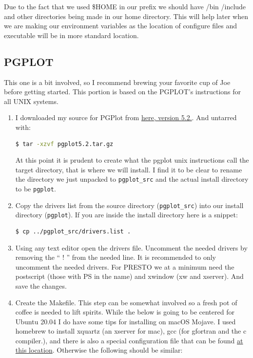 \documentclass{article}
\begin{document}
    	Due to the fact that we used \$HOME in our prefix we should have /bin /include and other directories
    	being made in our home directory. This will help later when we are making our environment variables
    	as the location of configure files and executable will be in more standard location.
    
    	\subsection{PGPLOT}
    	This one is a bit involved, so I recommend brewing your favorite cup of Joe before getting started. This
    	portion is based on the PGPLOT’s instructions for all UNIX systems. 
    	\begin{enumerate}
    	\item \noindent I downloaded my source for PGPlot from \href{ftp://ftp.astro.caltech.edu/pub/pgplot/pgplot5.2.tar.gz}{here, version 5.2.}. And untarred with: 
    	\begin{lstlisting}[language=bash]
    	$ tar -xzvf pgplot5.2.tar.gz
    	\end{lstlisting}
    	 At this point it is prudent to create what the pgplot unix instructions call the target directory, that is where we will install. I find it to be clear to rename the directory we just unpacked to \texttt{pgplot\_src} and the actual install directory to be \texttt{pgplot}. 
    	\item Copy the drivers list from the source directory (\texttt{pgplot\_src}) into our install directory (\texttt{pgplot}). If you are inside the install directory here is a snippet: \noindent
    	\begin{lstlisting}[language=bash]
    	$ cp ../pgplot_src/drivers.list .
    	\end{lstlisting} 
    	\item Using any text editor open the drivers file. Uncomment the needed drivers by removing the `` ! '' from the needed line. It is recommended to only uncomment the needed drivers. For PRESTO we at a minimum need the postscript (those with PS in the name) and xwindow (xw and xserver). And save the changes. 
    	\item Create the Makefile. This step can be somewhat involved so a fresh pot of coffee is needed to lift spirits. While the below is going to be centered for Ubuntu 20.04 I do have some tips for installing on macOS Mojave. I used homebrew to install xquartz (an xserver for mac), gcc (for gfortran and the c compiler.), and there is also a special configuration file that can be found \href{http://mingus.as.arizona.edu/~bjw/software/pgplot_macosx_conf.tar}{at this location}. Otherwise the following should be similar:

\end{enumerate}
\end{document}
